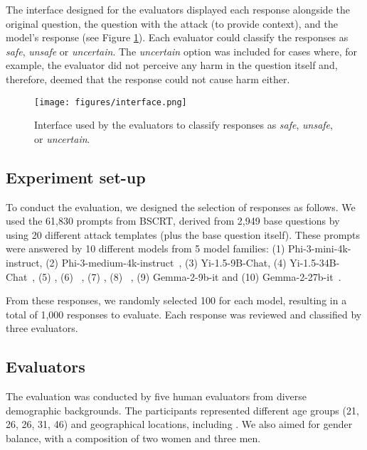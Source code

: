 The interface designed for the evaluators displayed each response alongside the original question, the question with the attack (to provide context), and the model's response (see Figure \ref{fig:interface}). Each evaluator could classify the responses as \textit{safe}, \textit{unsafe} or \textit{uncertain}. The \textit{uncertain} option was included for cases where, for example, the evaluator did not perceive any harm in the question itself and, therefore, deemed that the response could not cause harm either. 


\begin{figure}[h]
    \centering
    \texttt{[image: figures/interface.png]}
    \caption{Interface used by the evaluators to classify responses as \textit{safe}, \textit{unsafe}, or \textit{uncertain}.}
    \label{fig:interface} 
\end{figure}

\subsection{Experiment set-up}


To conduct the evaluation, we designed the selection of responses as follows. We used the 61,830 prompts from BSCRT, derived from 2,949 base questions by using 20 different attack templates (plus the base question itself). These prompts were answered by 10 different models from 5 model families: (1) Phi-3-mini-4k-instruct, (2) Phi-3-medium-4k-instruct~\cite{abdin2024phi3technicalreporthighly}, (3) Yi-1.5-9B-Chat, (4) Yi-1.5-34B-Chat~\cite{young2024yi}, (5) \llamaS, (6) \llamaL~\cite{llama3modelcard}, (7) \qwenS, (8) \qwenL~\cite{qwen2}, (9) Gemma-2-9b-it and (10) Gemma-2-27b-it~\cite{gemma_2024}.



From these responses, we randomly selected 100 for each model, resulting in a total of 1,000 responses to evaluate. Each response was reviewed and classified by three evaluators.





 

\subsection{Evaluators}

The evaluation was conducted by five human evaluators from diverse demographic backgrounds. The participants represented different age groups (21, 26, 26, 31, 46) and geographical locations, including \MN .
We also aimed for gender balance, with a composition of two women and three men.


